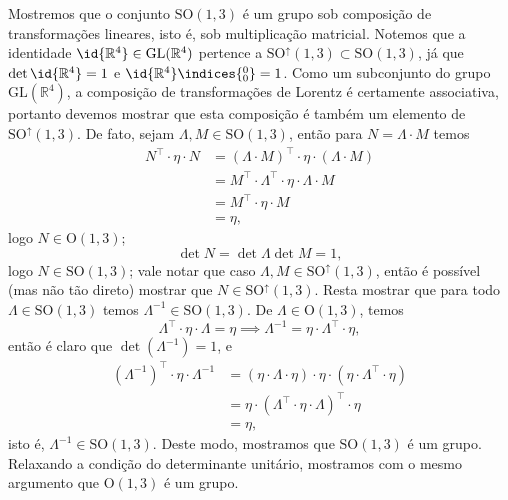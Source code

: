 Mostremos que o conjunto \(\mathrm{SO}(1,3)\) é um grupo sob composição de transformações lineares, isto é, sob multiplicação matricial. Notemos que a identidade \(\id{\mathbb{R}^4} \in \mathrm{GL}(\mathbb{R}^4)\) pertence a \(\mathrm{SO}^\uparrow(1,3) \subset \mathrm{SO}(1,3)\), já que \(\det\id{\mathbb{R}^4} = 1\) e \({\id{\mathbb{R}^4}}\indices{^0_0} = 1\). Como um subconjunto do grupo \(\mathrm{GL}(\mathbb{R}^4)\), a composição de transformações de Lorentz é certamente associativa, portanto devemos mostrar que esta composição é também um elemento de \(\mathrm{SO}^\uparrow(1,3)\). De fato, sejam \(\Lambda, M \in \mathrm{SO}(1,3)\), então para \(N = \Lambda \cdot M\) temos
\begin{align*}
    N^\top \cdot \eta \cdot N &= (\Lambda \cdot M)^\top \cdot \eta \cdot (\Lambda \cdot M)\\
                                  &= M^\top \cdot \Lambda^\top \cdot \eta \cdot \Lambda \cdot M\\
                                  &= M^\top \cdot \eta \cdot M\\
                                  &= \eta,
\end{align*}
logo \(N \in \mathrm{O}(1,3)\);
\begin{equation*}
    \det N = \det \Lambda \det M = 1,
\end{equation*}
logo \(N \in \mathrm{SO}(1,3)\); vale notar que caso \(\Lambda, M \in \mathrm{SO}^\uparrow(1,3)\), então é possível (mas não tão direto) mostrar que \(N \in \mathrm{SO}^\uparrow(1,3)\). Resta mostrar que para todo \(\Lambda \in \mathrm{SO}(1,3)\) temos \(\Lambda^{-1} \in \mathrm{SO}(1,3)\). De \(\Lambda \in \mathrm{O}(1,3)\), temos
\begin{equation*}
    \Lambda^\top\cdot \eta\cdot \Lambda = \eta \implies \Lambda^{-1} = \eta \cdot \Lambda^\top \cdot \eta,
\end{equation*}
então é claro que \(\det \left(\Lambda^{-1}\right) = 1\), e
\begin{align*}
    \left(\Lambda^{-1}\right)^\top \cdot \eta \cdot \Lambda^{-1} &= \left(\eta \cdot \Lambda \cdot \eta \right) \cdot \eta \cdot \left(\eta \cdot \Lambda^\top \cdot \eta\right)\\
                                                                 &= \eta \cdot \left(\Lambda^\top \cdot \eta \cdot \Lambda \right)^\top \cdot \eta\\
                                                                 &= \eta,
\end{align*}
isto é, \(\Lambda^{-1} \in \mathrm{SO}(1,3)\). Deste modo, mostramos que \(\mathrm{SO}(1,3)\) é um grupo. Relaxando a condição do determinante unitário, mostramos com o mesmo argumento que \(\mathrm{O}(1,3)\) é um grupo.

